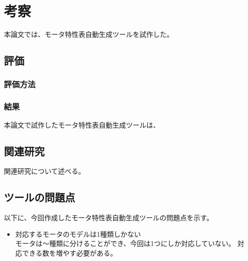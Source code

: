 \chapter{考察}\label{cha:Discussion}
本論文では、モータ特性表自動生成ツールを試作した。

\section{評価}

\subsection{評価方法}
\subsection{結果}
本論文で試作したモータ特性表自動生成ツールは、

\section{関連研究}

	関連研究について述べる。

\section{ツールの問題点}

以下に、今回作成したモータ特性表自動生成ツールの問題点を示す。

\begin{itemize}
	\item 対応するモータのモデルは1種類しかない\\
		  モータは～種類に分けることができ、今回は1つにしか対応していない。
		  対応できる数を増やす必要がある。
		
\end{itemize}







